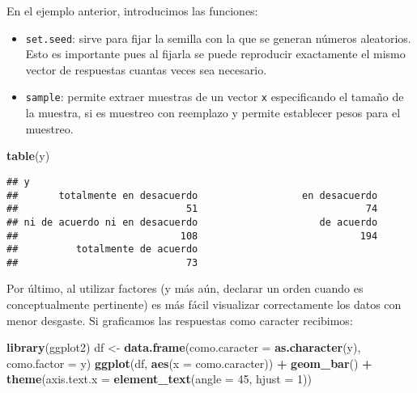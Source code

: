 \documentclass[]{article}
\newenvironment{Shaded}{\begin{snugshade}}{\end{snugshade}}
\newcommand{\KeywordTok}[1]{\textcolor[rgb]{0.13,0.29,0.53}{\textbf{#1}}}
\newcommand{\DataTypeTok}[1]{\textcolor[rgb]{0.13,0.29,0.53}{#1}}
\newcommand{\DecValTok}[1]{\textcolor[rgb]{0.00,0.00,0.81}{#1}}
\newcommand{\StringTok}[1]{\textcolor[rgb]{0.31,0.60,0.02}{#1}}
\newcommand{\OperatorTok}[1]{\textcolor[rgb]{0.81,0.36,0.00}{\textbf{#1}}}
\newcommand{\NormalTok}[1]{#1}
\begin{document}
\begin{curiosidad}
En el ejemplo anterior, introducimos las funciones:
\begin{itemize}
\item \texttt{set.seed}: sirve para fijar la semilla con la que se generan números aleatorios. Esto es importante pues al fijarla se puede reproducir exactamente el mismo vector de respuestas cuantas veces sea necesario.
\item \texttt{sample}: permite extraer muestras de un vector \texttt{x} especificando el tamaño de la muestra, si es muestreo con reemplazo y permite establecer pesos para el muestreo.
\end{itemize}
\end{curiosidad}

\begin{Shaded}
\begin{Highlighting}[]
\KeywordTok{table}\NormalTok{(y)}
\end{Highlighting}
\end{Shaded}

\begin{verbatim}
## y
##       totalmente en desacuerdo                  en desacuerdo 
##                             51                             74 
## ni de acuerdo ni en desacuerdo                     de acuerdo 
##                            108                            194 
##          totalmente de acuerdo 
##                             73
\end{verbatim}

Por último, al utilizar factores (y más aún, declarar un orden cuando es
conceptualmente pertinente) es más fácil visualizar correctamente los
datos con menor desgaste. Si graficamos las respuestas como caracter
recibimos:

\begin{Shaded}
\begin{Highlighting}[]
\KeywordTok{library}\NormalTok{(ggplot2)}
\NormalTok{df <-}\StringTok{ }\KeywordTok{data.frame}\NormalTok{(}\DataTypeTok{como.caracter =} \KeywordTok{as.character}\NormalTok{(y), }\DataTypeTok{como.factor =}\NormalTok{ y) }
\KeywordTok{ggplot}\NormalTok{(df, }\KeywordTok{aes}\NormalTok{(}\DataTypeTok{x =}\NormalTok{ como.caracter)) }\OperatorTok{+}\StringTok{ }\KeywordTok{geom_bar}\NormalTok{() }\OperatorTok{+}\StringTok{ }
\StringTok{  }\KeywordTok{theme}\NormalTok{(}\DataTypeTok{axis.text.x =} \KeywordTok{element_text}\NormalTok{(}\DataTypeTok{angle =} \DecValTok{45}\NormalTok{, }\DataTypeTok{hjust =} \DecValTok{1}\NormalTok{))}
\end{Highlighting}
\end{Shaded}
\end{document}
